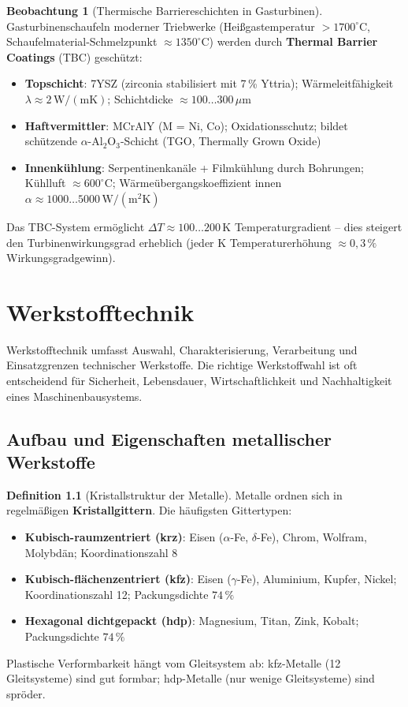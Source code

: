 ﻿\documentclass[a4paper,12pt]{report}
\theoremstyle{definition}
\newtheorem{definition}{Definition}
\newtheorem{beobachtung}{Beobachtung}
\begin{document}
\begin{beobachtung}[Thermische Barriereschichten in Gasturbinen]
Gasturbinenschaufeln moderner Triebwerke (Heißgastemperatur $> 1700^\circ\mathrm{C}$,
Schaufelmaterial-Schmelzpunkt $\approx 1350^\circ\mathrm{C}$) werden durch
\textbf{Thermal Barrier Coatings} (TBC) geschützt:
\begin{itemize}
    \item[-] \textbf{Topschicht}: 7YSZ (zirconia stabilisiert mit 7\,\% Yttria);
          Wärmeleitfähigkeit $\lambda \approx 2\,\mathrm{W/(mK)}$; Schichtdicke $\approx 100\ldots300\,\mu\mathrm{m}$
    \item[-] \textbf{Haftvermittler}: MCrAlY (M = Ni, Co); Oxidationsschutz;
          bildet schützende $\alpha$-Al$_2$O$_3$-Schicht (TGO, Thermally Grown Oxide)
    \item[-] \textbf{Innenkühlung}: Serpentinenkanäle + Filmkühlung durch
          Bohrungen; Kühlluft $\approx 600^\circ\mathrm{C}$;
          Wärmeübergangskoeffizient innen $\alpha \approx 1000\ldots5000\,\mathrm{W/(m^2 K)}$
\end{itemize}
Das TBC-System ermöglicht $\Delta T \approx 100\ldots200\,\mathrm{K}$ Temperaturgradient --
dies steigert den Turbinenwirkungsgrad erheblich (jeder K Temperaturerhöhung
$\approx 0{,}3\,\%$ Wirkungsgradgewinn).
\end{beobachtung}

\chapter{Werkstofftechnik}

Werkstofftechnik umfasst Auswahl, Charakterisierung, Verarbeitung
und Einsatzgrenzen technischer Werkstoffe. Die richtige Werkstoffwahl
ist oft entscheidend f\"ur Sicherheit, Lebensdauer, Wirtschaftlichkeit
und Nachhaltigkeit eines Maschinenbausystems.

\section{Aufbau und Eigenschaften metallischer Werkstoffe}

\begin{definition}[Kristallstruktur der Metalle]
Metalle ordnen sich in regelm\"a\ss{}igen \textbf{Kristallgittern}.
Die h\"aufigsten Gittertypen:
\begin{itemize}
    \item[-] \textbf{Kubisch-raumzentriert (krz)}: Eisen ($\alpha$-Fe, $\delta$-Fe),
          Chrom, Wolfram, Molybd\"an; Koordinationszahl 8
    \item[-] \textbf{Kubisch-fl\"achenzentriert (kfz)}: Eisen ($\gamma$-Fe), Aluminium,
          Kupfer, Nickel; Koordinationszahl 12; Packungsdichte $74\,\%$
    \item[-] \textbf{Hexagonal dichtgepackt (hdp)}: Magnesium, Titan, Zink,
          Kobalt; Packungsdichte $74\,\%$
\end{itemize}
Plastische Verformbarkeit h\"angt vom Gleitsystem ab: kfz-Metalle
(12 Gleitsysteme) sind gut formbar; hdp-Metalle (nur wenige Gleitsysteme)
sind spröder.
\end{definition}
\end{document}
